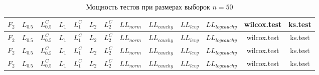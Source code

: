 \documentclass{article}
\begin{document}
\begin{longtable}{|c|c|c|c|c|c|c|c|c|c|c|c|c|}
  \caption{Мощность тестов при размерах выборок $n=50$}
  \label{table:n50} \\
  \hline
  $F_2$ & $L_{0.5}$ & $L_{0.5}^C$ & $L_{1}$ & $L_{1}^C$ & $L_{2}$ & $L_{2}^C$ & $LL_{norm}$ & $LL_{cauchy}$ & $LL_{levy}$ & $LL_{logcauchy}$ & wilcox.test & ks.test \\ \hline
  
  
  
  
  $F_2$ & $L_{0.5}$ & $L_{0.5}^C$ & $L_{1}$ & $L_{1}^C$ & $L_{2}$ & $L_{2}^C$ & $LL_{norm}$ & $LL_{cauchy}$ & $LL_{levy}$ & $LL_{logcauchy}$ & wilcox.test & ks.test \\ \hline
  
  
  
  
  $F_2$ & $L_{0.5}$ & $L_{0.5}^C$ & $L_{1}$ & $L_{1}^C$ & $L_{2}$ & $L_{2}^C$ & $LL_{norm}$ & $LL_{cauchy}$ & $LL_{levy}$ & $LL_{logcauchy}$ & wilcox.test & ks.test \\ \hline
  
  
  
  
  $F_2$ & $L_{0.5}$ & $L_{0.5}^C$ & $L_{1}$ & $L_{1}^C$ & $L_{2}$ & $L_{2}^C$ & $LL_{norm}$ & $LL_{cauchy}$ & $LL_{levy}$ & $LL_{logcauchy}$ & wilcox.test & ks.test \\ \hline
  
  
  
  
\end{longtable}
\end{document}
